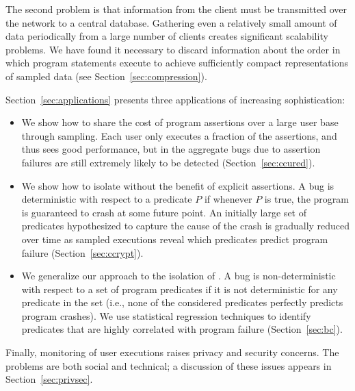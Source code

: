 The second problem is that information from the client must be
transmitted over the network to a central database.  Gathering even a
relatively small amount of data periodically from a large number of
clients creates significant scalability problems.  We have found it
necessary to discard information about the order in which program
statements execute to achieve sufficiently compact representations of
sampled data (see Section~\ref{sec:compression}).

Section~\ref{sec:applications} presents three applications
of increasing sophistication:

\begin{itemize}
\item We show how to share the cost of program assertions over a large
  user base through sampling.  Each user only executes a fraction of
  the assertions, and thus sees good performance, but in the aggregate
  bugs due to assertion failures are still extremely likely to be
  detected (Section~\ref{sec:ccured}).

\item We show how to isolate  without the
  benefit of explicit assertions.  A bug is deterministic with respect
  to a predicate $P$ if whenever $P$ is true, the program is
  guaranteed to crash at some future point.  An initially large set of
  predicates hypothesized to capture the cause of the crash is
  gradually reduced over time as sampled executions reveal which
  predicates predict program failure (Section~\ref{sec:ccrypt}).
  
\item We generalize our approach to the isolation of
  .  A bug is non-deterministic with
  respect to a set of program predicates if it is not deterministic
  for any predicate in the set (i.e., none of the considered
  predicates perfectly predicts program crashes).  We use statistical
  regression techniques to identify predicates that are highly
  correlated with program failure (Section~\ref{sec:bc}).
\end{itemize}

Finally, monitoring of user executions raises privacy
and security concerns.  The problems are both social and technical; a
discussion of these issues appears in Section~\ref{sec:privsec}.

